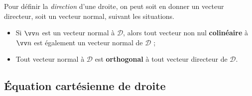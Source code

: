 \documentclass[a4paper,11pt]{article}
\begin{document}
\begin{cmethode}
Pour définir la \textit{direction} d'une droite, on peut soit en donner un vecteur directeur, soit un vecteur normal, suivant les situations.
\end{cmethode}

\begin{cprop}[s]
\vspace{-0.2cm}
\begin{itemize}[leftmargin=*]
	\item Si $\vect{n}$ est un vecteur normal à $\mathscr{D}$, alors tout vecteur non nul \textbf{colinéaire} à $\vect{n}$ est également un vecteur normal de $\mathscr{D}$ ;
	\item Tout vecteur normal à $\mathscr{D}$ est \textbf{orthogonal} à tout vecteur directeur de $\mathscr{D}$.
\end{itemize}
\end{cprop}

\subsection{Équation cartésienne de droite}
\end{document}
